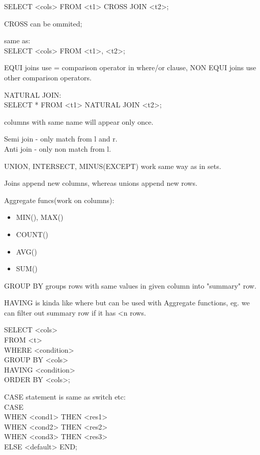 \documentclass{article}
\begin{document}
    SELECT <cols>
    FROM <t1>
    CROSS JOIN <t2>;

    CROSS can be ommited;

    same as: \\
    SELECT <cols>
    FROM <t1>, <t2>;

    EQUI joins use = comparison operator in where/or clause,
    NON EQUI joins use other comparison operators.

    NATURAL JOIN: \\
    SELECT *
    FROM <t1>
    NATURAL JOIN <t2>;

    columns with same name will appear only once.

    Semi join - only match from l and r. \\
    Anti join - only non match from l.

    UNION, INTERSECT, MINUS(EXCEPT) work same way as in sets.

    Joins append new columns, whereas unions append new rows.

    Aggregate funcs(work on columns):
    \begin{itemize}
        \item MIN(), MAX() 
        \item COUNT()
        \item AVG()
        \item SUM()
    \end{itemize}

    GROUP BY groups rows with same values in given column into "summary" row.

    HAVING is kinda like where but can be used with Aggregate functions,
    eg. we can filter out summary row if it has <n rows.

    SELECT <cols> \\
    FROM <t> \\
    WHERE <condition> \\
    GROUP BY <cols> \\
    HAVING <condition> \\
    ORDER BY <cols>;

    CASE statement is same as switch etc: \\
    CASE \\
        WHEN <cond1> THEN <res1> \\
        WHEN <cond2> THEN <res2> \\
        WHEN <cond3> THEN <res3> \\
        ELSE <default>
    END;
\end{document}
